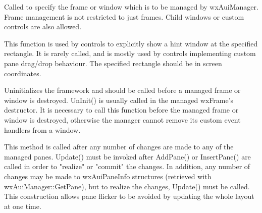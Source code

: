\label{wxauimanagersetmanagedwindow}


Called to specify the frame or window which is to be managed by wxAuiManager.  Frame management is not restricted to just frames.  Child windows or custom controls are also allowed.

\label{wxauimanagershowhint}


This function is used by controls to explicitly show a hint window at the specified rectangle.  It is rarely called, and is mostly used by controls implementing custom pane drag/drop behaviour.  The specified rectangle should be in screen coordinates.

\label{wxauimanageruninit}


Uninitializes the framework and should be called before a managed frame or window is destroyed. UnInit() is usually called in the managed wxFrame's destructor.  It is necessary to call this function before the managed frame or window is destroyed, otherwise the manager cannot remove its custom event handlers from a window.

\label{wxauimanagerupdate}


This method is called after any number of changes are
made to any of the managed panes. Update() must be invoked after
AddPane() or InsertPane() are called in order to "realize" or "commit"
the changes. In addition, any number of changes may be made to
wxAuiPaneInfo structures (retrieved with wxAuiManager::GetPane), but to
realize the changes, Update() must be called. This construction allows
pane flicker to be avoided by updating the whole layout at one time.

